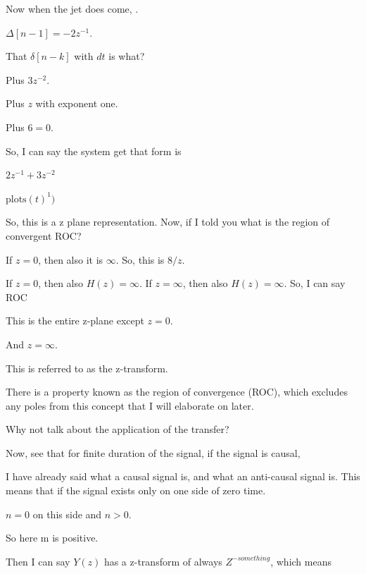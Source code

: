 \documentclass{article}
\begin{document}
Now when the jet does come, .

$\Delta[n-1] = -2z^{-1}$.

That $\delta[n-k]$ with $dt$ is what?

Plus $3z^{-2}$.

Plus $z$ with exponent one.

Plus $6 = 0$.

So, I can say the system get that form is

$2z^{-1} + 3z^{-2}$

$\text{plots}(t)^1)$





So, this is a z plane representation. Now, if I told you what is the region of convergent ROC?

If $z = 0$, then also it is $\infty$. So, this is $8/z$.

If $z = 0$, then also $H(z) = \infty$. If $z = \infty$, then also $H(z) = \infty$. So, I can say ROC

This is the entire z-plane except $z = 0$.

And $z = \infty$.





This is referred to as the z-transform.

There is a property known as the region of convergence (ROC), which excludes any poles from this concept that I will elaborate on later.

Why not talk about the application of the transfer?

Now, see that for finite duration of the signal, if the signal is causal,

I have already said what a causal signal is, and what an anti-causal signal is. This means that if the signal exists only on one side of zero time.



$n = 0$ on this side and $n > 0$.

So here m is positive.

Then I can say $Y(z)$ has a z-transform of always $Z^{-something}$, which means
\end{document}
